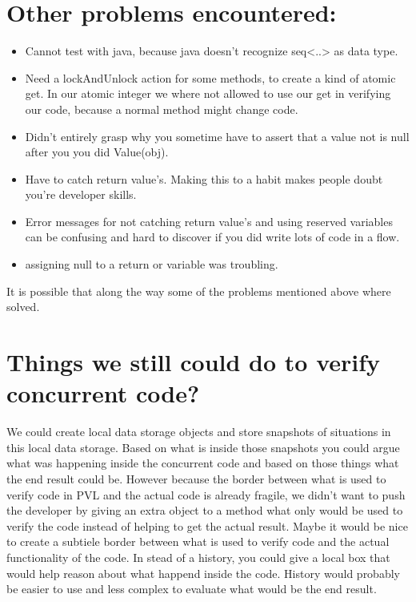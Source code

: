 \section{Other problems encountered:}
\begin{itemize}
	\item Cannot test with java, because java doesn't recognize seq<..> as data type.
	\item Need a lockAndUnlock action for some methods, to create a kind of atomic get. In our atomic integer we where not allowed to use our get in verifying our code, because a normal method might change code.
	\item Didn't entirely grasp why you sometime have to assert that a value not is null after you you did Value(obj).
	\item Have to catch return value's. Making this to a habit makes people doubt you're developer skills.
	\item Error messages for not catching return value's and using reserved variables can be confusing and hard to discover if you did write lots of code in a flow.
	\item assigning null to a return or variable was troubling.
\end{itemize}

It is possible that along the way some of the problems mentioned above where solved.

\section{Things we still could do to verify concurrent code?}

We could create local data storage objects and store snapshots of situations in this local data storage. Based on what is inside those snapshots you could argue what was happening inside the concurrent code and based on those things what the end result could be. However because the border between what is used to verify code in PVL and the actual code is already fragile, we didn't want to push the developer by giving an extra object to a method what only would be used to verify the code instead of helping to get the actual result. Maybe it would be nice to create a subtiele border between what is used to verify code and the actual functionality of the code. In stead of a history, you could give a local box that would help reason about what happend inside the code. History would probably be easier to use and less complex to evaluate what would be the end result.